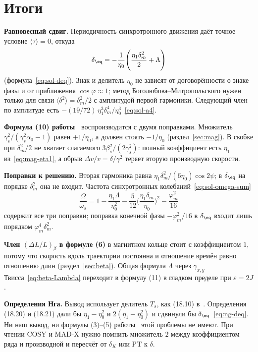 \section{Итоги}
\label{sec:summary}

\textbf{Равновесный сдвиг.} Периодичность синхротронного движения даёт точное условие $\langle\tau\rangle=0$, откуда
\[
\delta_\eq=-\frac{1}{\eta_0}\Biggl(\frac{\eta_1\delta_m^2}{2}+\Lambda\Biggr)
\]
(формула~\eqref{eq:sol-deq}). Знак и делитель $\eta_0$ не зависят от договорённости о знаке фазы и от приближения $\cos\varphi\approx 1$; метод Боголюбова--Митропольского нужен только для связи $\langle\delta^2\rangle=\delta_m^2/2$ с амплитудой первой гармоники. Следующий член по амплитуде есть $-(19/72)\,\eta_1^3\delta_m^4/\eta_0^3$~\eqref{eq:sol-a4}.

\textbf{Формула (10) работы~\cite{Senichev2013}} воспроизводится с двумя поправками. Множитель $\gamma_s^2/(\gamma_s^2\alpha_0-1)$ равен $+1/\eta_0$, а должен стоять $-1/\eta_0$ (раздел~\ref{sec:mag}). В скобке при $\delta_m^2/2$ не хватает слагаемого $3\beta_s^2/(2\gamma_s^2)$: полный коэффициент есть $\eta_1$ из~\eqref{eq:mag-eta1}, а обрыв $\Delta v/v=\delta/\gamma^2$ теряет вторую производную скорости.

\textbf{Поправки к решению.} Вторая гармоника равна $\eta_1\delta_m^2/(6\eta_0)\cos 2\psi$; в $\delta_\eq$ на порядке $\delta_m^2$ она не входит. Частота синхротронных колебаний~\eqref{eq:sol-omega-sum}
\[
\frac{\Omega}{\omega_s}=1-\frac{\eta_1\Lambda}{\eta_0^2}-\frac{5}{12}\Biggl(\frac{\eta_1\delta_m}{\eta_0}\Biggr)^2-\frac{\varphi_m^2}{16}
\]
содержит все три поправки; поправка конечной фазы $-\varphi_m^2/16$ в $\delta_\eq$ входит лишь порядком $\varphi_m^4\delta_m^2$.

\textbf{Член $(\Delta L/L)_\beta$ в формуле (6)} в магнитном кольце стоит с коэффициентом $1$, потому что скорость вдоль траектории постоянна и отношение времён равно отношению длин (раздел~\ref{sec:beta}). Общая формула $\Lambda$ через $\gamma_{x,y}$ Твисса~\eqref{eq:beta-Lambda} переходит в формулу (11) в гладком пределе при $\varepsilon=2J$.

\textbf{Определения Нга.} Вывод использует делитель $T_s$, как (18.10) в~\cite{Ng2006}. Определения (18.20) и (18.21) дали бы $\eta_1-\eta_0^2$ и $2(\eta_1-\eta_0^2)$ и сдвинули бы $\delta_\eq$~\eqref{eq:ng-deq}. Ни наш вывод, ни формулы (3)--(5) работы~\cite{Senichev2013} этой проблемы не имеют. При чтении COSY и MAD-X нужно помнить множитель $2$ между коэффициентом ряда и производной и пересчёт от $\delta_K$ или $\mathrm{PT}$ к $\delta$.

